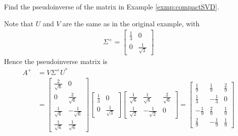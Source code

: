 \begin{exmp}
\label{exmp:compactpinv}
Find the pseudoinverse of the matrix in Example \ref{exmp:compactSVD}.
\end{exmp}
\begin{solution}
Note that $U$ and $V$ are the same as in the original example, with
\begin{align*}
\Sigma^+ = 
\begin{bmatrix}
\frac{1}{3} & 0 \\
0 & \frac{1}{\sqrt{3}}
\end{bmatrix}
\end{align*}
Hence the pseudoinverse matrix is
\begin{align*}
A^+ &= V\Sigma^+ U^* \\
&=
\begin{bmatrix}
\frac{2}{\sqrt{6}} & 0 \\
0 & \frac{2}{\sqrt{6}} \\
\frac{1}{\sqrt{6}} & -\frac{1}{\sqrt{6}}\\
\frac{1}{\sqrt{6}} & \frac{1}{\sqrt{6}}   
\end{bmatrix}
\begin{bmatrix}
\frac{1}{3} & 0 \\
0 & \frac{1}{\sqrt{3}}
\end{bmatrix}
\begin{bmatrix}
\frac{1}{\sqrt{6}} & \frac{1}{\sqrt{6}} & \frac{2}{\sqrt{6}} \\  
\frac{1}{\sqrt{2}} & -\frac{1}{\sqrt{2}} & 0
\end{bmatrix} =
\begin{bmatrix}
\frac{1}{9}&\frac{1}{9}&\frac{2}{9}\\ 
\frac{1}{3}&-\frac{1}{3}&0\\ 
-\frac{1}{9}&\frac{2}{9}&\frac{1}{9}\\ 
\frac{2}{9}&-\frac{1}{9}&\frac{1}{9}
\end{bmatrix}
\end{align*}
\end{solution}
